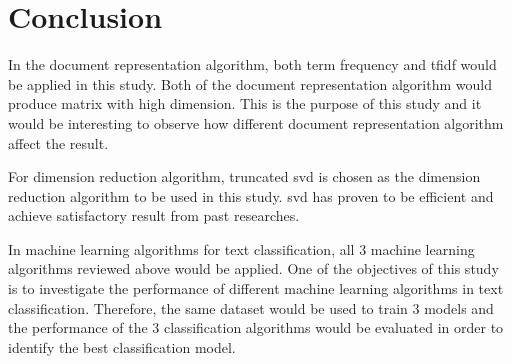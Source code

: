 \section{Conclusion}
In the document representation algorithm, both term frequency and \ac{tfidf} would be applied in this study. Both of the document representation algorithm would produce matrix with high dimension. This is the purpose of this study and it would be interesting to observe how different document representation algorithm affect the result.

For dimension reduction algorithm, truncated \ac{svd} is chosen as the dimension reduction algorithm to be used in this study. \Ac{svd} has proven to be efficient and achieve satisfactory result from past researches.
	
In machine learning algorithms for text classification, all 3 machine learning algorithms reviewed above would be applied. One of the objectives of this study is to investigate the performance of different machine learning algorithms in text classification. Therefore, the same dataset would be used to train 3 models and the performance of the 3 classification algorithms would be evaluated in order to identify the best classification model.
